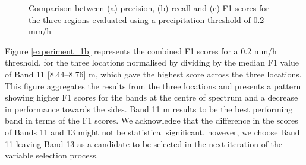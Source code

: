 \documentclass[3p,times]{elsarticle}
\begin{document}
\begin{figure}%
    \centering
    \quad
    
    \caption{Comparison between (a) precision, (b) recall and (c) F1 scores for the three regions evaluated using a precipitation threshold of 0.2 mm/h}%
    \label{experiment_1a}%
\end{figure}


Figure \ref{experiment_1b} represents the combined F1 scores for a 0.2 mm/h threshold, for the three locations normalised by dividing by the median F1 value of Band 11 [8.44–8.76] \textmu m, which gave the highest score across the three locations. This figure aggregates the results from the three locations and presents a pattern showing higher F1 scores for the bands at the centre of spectrum and a decrease in performance towards the sides. Band 11  m results to be the best performing band in terms of the F1 scores. We acknowledge that the difference in the scores of Bands 11 and 13 might not be statistical significant, however, we choose Band 11 leaving Band 13 as a candidate to be selected in the next iteration of the variable selection process. 
\end{document}
